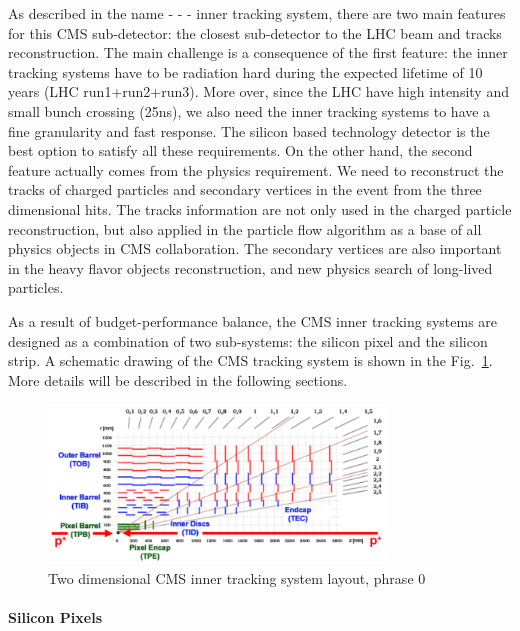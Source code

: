 As described in the name - - - inner tracking system, there are two main features for this CMS sub-detector: the closest sub-detector to the LHC beam and tracks reconstruction. The main challenge is a consequence of the first feature: the inner tracking systems have to be radiation hard during the expected lifetime of 10 years (LHC run1+run2+run3). More over, since the LHC have high intensity and small bunch crossing (25ns), we also need the inner tracking systems to have a fine granularity and fast response. The silicon based technology detector is the best option to satisfy all these requirements. On the other hand, the second feature actually comes from the physics requirement. We need to reconstruct the tracks of charged particles and secondary vertices in the event from the three dimensional hits. The tracks information are not only used in the charged particle reconstruction, but also applied in the particle flow algorithm as a base of all physics objects in CMS collaboration. The secondary vertices are also important in the heavy flavor objects reconstruction, and new physics search of long-lived particles. 

As a result of budget-performance balance, the CMS inner tracking systems are designed as a combination of two sub-systems: the silicon pixel and the silicon strip. A schematic drawing of the CMS tracking system is shown in the Fig.~\ref{fig:c3cms2dtracker}. More details will be described in the following sections. 

\begin{figure}[htbp]
 \begin{center}
  \includegraphics[width=0.8\textwidth]{figures/c3/c3_cms_2dtracker.png}
 \end{center}
 \caption{Two dimensional CMS inner tracking system layout, phrase 0}
 \label{fig:c3cms2dtracker}
\end{figure}

\paragraph{Silicon Pixels}

